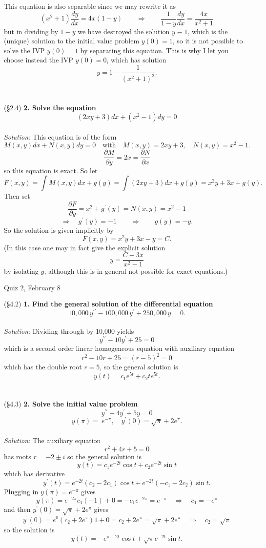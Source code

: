 \documentclass[12pt]{article}
\begin{document}
This equation is also separable since we may rewrite it as
$$(x^2+1) \frac{dy}{dx} = 4x(1-y) \qquad\Rightarrow\qquad \frac{1}{1-y} \frac{dy}{dx} = \frac{4x}{x^2+1}$$
but in dividing by $1-y$ we have destroyed the solution $y \equiv 1$, which is the (unique) solution to the initial value problem $y(0) = 1$, so it is not possible to solve the IVP $y(0) = 1$ by separating this equation.  This is why I let you choose instead the IVP $y(0) = 0$, which has solution
$$y = 1 - \frac{1}{(x^2+1)^2}.$$
~\\~\\
(\S 2.4) \textbf{2. Solve the equation}
$$(2xy + 3) dx + (x^2 - 1) dy = 0$$
~\\
\emph{Solution}: This equation is of the form
$$M(x,y) dx + N(x,y) dy = 0 \quad\text{with}\quad M(x,y) = 2xy + 3, \quad N(x,y) = x^2 - 1.$$
$$\frac{\partial M}{\partial y} = 2x = \frac{\partial N}{\partial x}$$
so this equation is exact.  So let
$$F(x,y) = \int M(x,y)dx + g(y) = \int (2xy + 3) dx + g(y) = x^2 y + 3x + g(y).$$
Then set
$$\frac{\partial F}{\partial y} = x^2 + g^\prime (y) = N(x,y) = x^2 - 1$$
$$\Rightarrow\quad g^\prime (y) = -1 \qquad\Rightarrow\qquad g(y) = -y.$$
So the solution is given implicitly by
$$F(x,y) = x^2 y + 3x - y = C.$$
(In this case one may in fact give the explicit solution
$$y = \frac{C - 3x}{x^2 - 1}$$
by isolating $y$, although this is in general not possible for exact equations.)

\pagebreak

\begin{center}
{\Large Quiz 2, February 8}
\end{center}
(\S 4.2) \textbf{1. Find the general solution of the differential equation}
$$10, \! 000 \, y^{\prime\prime} - 100, \! 000 \, y^\prime + 250, \! 000 \, y = 0.$$
~\\
\emph{Solution}: Dividing through by 10,000 yields
$$y^{\prime\prime} - 10y^\prime + 25 = 0$$
which is a second order linear homogeneous equation with auxiliary equation
$$r^2 - 10r + 25 = (r-5)^2 = 0$$
which has the double root $r = 5$, so the general solution is
$$y(t) = c_1 e^{5t} + c_2 t e^{5t}.$$ 
~\\~\\
(\S 4.3) \textbf{2. Solve the initial value problem}
$$y^{\prime\prime} + 4y^\prime + 5y = 0$$
$$y(\pi) =\ e^{-\pi}, \quad y^\prime (0) = \sqrt{\pi} + 2e^\pi.$$
~\\
\emph{Solution}: The auxiliary equation
$$r^2 + 4r + 5 = 0$$
has roots $r = -2 \pm i$ so the general solution is
$$y(t) = c_1 e^{-2t} \cos t + c_2 e^{-2t} \sin t$$
which has derivative
$$y^\prime (t) = e^{-2t} (c_2 - 2c_1) \cos t + e^{-2t} (-c_1 - 2c_2) \sin t.$$
Plugging in $y(\pi) = e^{-\pi}$ gives
$$y(\pi) = e^{-2\pi} c_1 (-1) + 0 = - c_1 e^{-2\pi} = e^{-\pi} \quad\Rightarrow\quad c_1 = -e^\pi$$ 
and then $y^\prime(0) = \sqrt{\pi} + 2e^\pi$ gives 
$$y^\prime (0) = e^0 (c_2 + 2e^\pi) 1 + 0 = c_2 + 2e^\pi = \sqrt{\pi} + 2e^\pi \quad\Rightarrow\quad c_2 = \sqrt{\pi}$$
so the solution is
$$y(t) = -e^{\pi-2t} \cos t + \sqrt{\pi} e^{-2t} \sin t.$$ 
\end{document}
